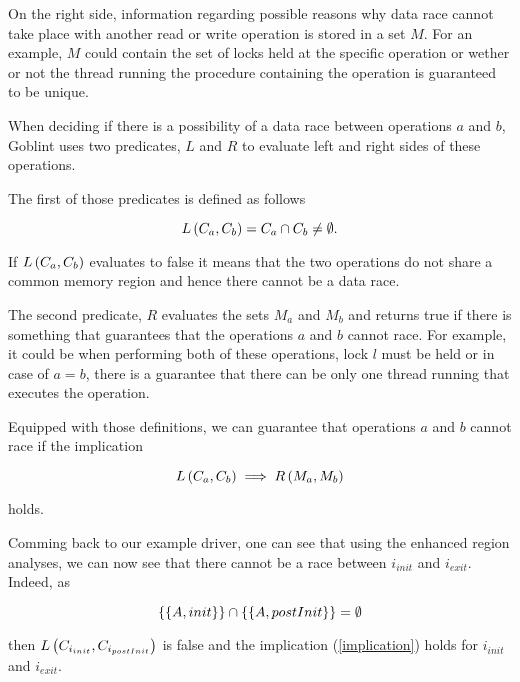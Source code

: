 \documentclass[..thesis.tex]{subfiles}
\begin{document}
On the right side, information regarding possible reasons why data race cannot take place with another read or write operation is stored in a set $M$. For an example, $M$ could contain the set of locks held at the specific operation or wether or not the thread running the procedure containing the operation is guaranteed to be unique.

When deciding if there is a possibility of a data race between operations $a$ and $b$, Goblint uses two predicates, $L$ and $R$ to evaluate left and right sides of these operations. 

The first of those predicates is defined as follows

\begin{equation*}
L \left( C_a, C_b \right) =  C_a \cap C_b \neq \emptyset \text{.}
\end{equation*}

If $L \left( C_a, C_b \right)$ evaluates to false it means that the two operations do not share a common memory region and hence there cannot be a data race. 

The second predicate, $R$ evaluates the sets $M_a$ and $M_b$ and returns true if there is something that guarantees that the operations $a$ and $b$ cannot race. For example, it could be when performing both of these operations, lock $l$ must be held or in case of $a=b$, there is a guarantee that there can be only one thread running that executes the operation.

Equipped with those definitions, we can guarantee that operations $a$ and $b$ cannot race if the implication

\begin{equation}
\label{implication}
L \left( C_a, C_b \right) \implies R \left( M_a, M_b \right)  
\end{equation}

holds.

Comming back to our example driver, one can see that using the enhanced region analyses, we can now see that there cannot be a race between $i_{init}$ and $i_{exit}$. Indeed, as


\begin{equation*}
 \left\lbrace \left\lbrace A, init \right\rbrace \right\rbrace \cap  \left\lbrace \left\lbrace A, postInit \right\rbrace \right\rbrace = \emptyset
\end{equation*}

then $L \left( C_{i_{init}}, C_{i_{postInit}} \right)$ is false and the implication (\ref{implication}) holds for $i_{init}$ and $i_{exit}$.
\end{document}
